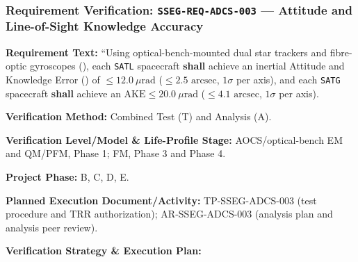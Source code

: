 \subsubsection{Requirement Verification: \texttt{SSEG-REQ-ADCS-003} --- Attitude and Line-of-Sight Knowledge Accuracy}
\label{ver:SSEG-REQ-ADCS-003}
\textbf{Requirement Text:} ``Using optical-bench-mounted dual star trackers and fibre-optic gyroscopes (), each \texttt{SATL} spacecraft \textbf{shall} achieve an inertial Attitude and  Knowledge Error () of $\le 12.0~\mu\mathrm{rad}$ ($\le 2.5\text{ arcsec}$, $1\sigma$ per axis), and each \texttt{SATG} spacecraft \textbf{shall} achieve an $\text{AKE} \le 20.0~\mu\mathrm{rad}$ ($\le 4.1\text{ arcsec}$, $1\sigma$ per axis).
\par\textbf{Verification Method:} Combined Test (T) and Analysis (A).
\par\textbf{Verification Level/Model \& Life-Profile Stage:} AOCS/optical-bench EM and QM/PFM, Phase 1; FM, Phase 3 and Phase 4.
\par\textbf{Project Phase:} B, C, D, E.
\par\textbf{Planned Execution Document/Activity:} TP-SSEG-ADCS-003 (test procedure and TRR authorization); AR-SSEG-ADCS-003 (analysis plan and analysis peer review).
\par\textbf{Verification Strategy \& Execution Plan:}

